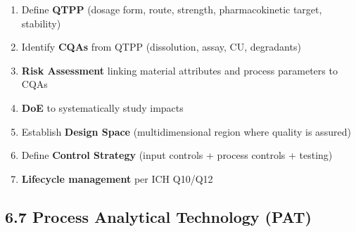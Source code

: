 \documentclass[
  11pt,
  a4paper,
]{report}
\providecommand{\tightlist}{%
  \setlength{\itemsep}{0pt}\setlength{\parskip}{0pt}}
\begin{document}
\begin{enumerate}
\def\labelenumi{\arabic{enumi}.}
\tightlist
\item
  Define \textbf{QTPP} (dosage form, route, strength, pharmacokinetic
  target, stability)
\item
  Identify \textbf{CQAs} from QTPP (dissolution, assay, CU, degradants)
\item
  \textbf{Risk Assessment} linking material attributes and process
  parameters to CQAs
\item
  \textbf{DoE} to systematically study impacts
\item
  Establish \textbf{Design Space} (multidimensional region where quality
  is assured)
\item
  Define \textbf{Control Strategy} (input controls + process controls +
  testing)
\item
  \textbf{Lifecycle management} per ICH Q10/Q12
\end{enumerate}

\hypertarget{process-analytical-technology-pat}{%
\subsection{6.7 Process Analytical Technology
(PAT)}\label{process-analytical-technology-pat}}
\end{document}
